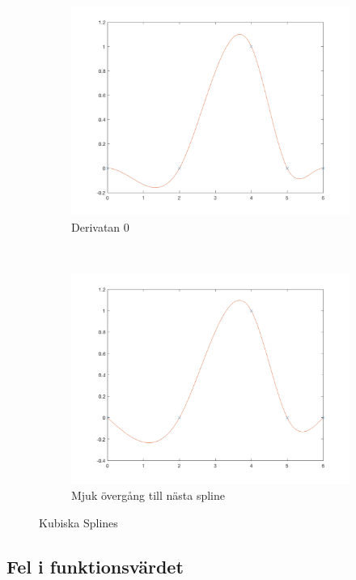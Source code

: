 \documentclass[12pt,a4paper]{article}
\begin{document}
\begin{figure}[H]
    \centering
    \begin{subfigure}[b]{0.45\textwidth}
        \includegraphics[width=\textwidth]{3-2}
        \caption{Derivatan 0}
    \end{subfigure}
    ~ %
    \begin{subfigure}[b]{0.45\textwidth}
        \includegraphics[width=\textwidth]{3-1}
        \caption{Mjuk övergång till nästa spline}
    \end{subfigure}
    \caption{Kubiska Splines}
\end{figure}

\subsection{Fel i funktionsvärdet}
\end{document}
